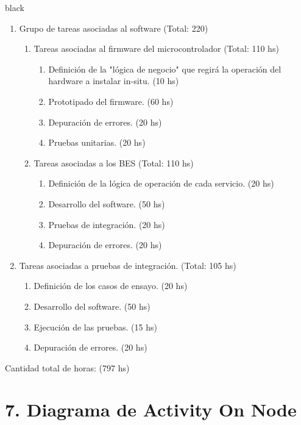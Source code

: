 \documentclass[11pt]{charter}
\begin{document}
\begin{consigna}{black}
\begin{enumerate}
	\item Grupo de tareas asociadas al software (Total: 220)
	\begin{enumerate}
		\item Tareas asociadas al firmware del microcontrolador (Total: 110 hs)
			\begin{enumerate}
				\item Definición de la "lógica de negocio" que regirá la operación del hardware a instalar in-situ. (10 hs)
				\item Prototipado del firmware. (60 hs)
				\item Depuración de errores. (20 hs)
				\item Pruebas unitarias. (20 hs)
			\end{enumerate}
		
		 \item Tareas asociadas a los BES (Total: 110 hs)
			\begin{enumerate}
				\item Definición de la lógica de operación de cada servicio. (20 hs)
				\item Desarrollo del software. (50 hs)
				\item Pruebas de integración. (20 hs)
				\item Depuración de errores. (20 hs)
			\end{enumerate}				
		
		\end{enumerate}
		
		 \item Tareas asociadas a pruebas de integración. (Total: 105 hs)
		 \begin{enumerate}
		 	\item Definición de los casos de ensayo. (20 hs)
		 	\item Desarrollo del software. (50 hs)
		 	\item Ejecución de las pruebas. (15 hs)
		 	\item Depuración de errores. (20 hs)
		 \end{enumerate}		
	\end{enumerate}

Cantidad total de horas: (797 hs)

\end{consigna}

\section{7. Diagrama de Activity On Node}
\label{sec:AoN}
\end{document}
